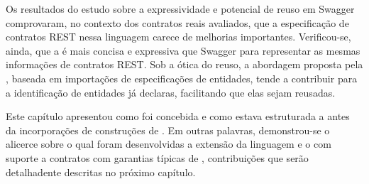 Os resultados do estudo sobre a expressividade e potencial de reuso em Swagger
comprovaram, no contexto dos contratos reais avaliados, que a especificação de
contratos REST nessa linguagem carece de melhorias importantes. Verificou-se,
ainda, que a \neoidl{} é mais concisa e expressiva que Swagger para representar
as mesmas informações de contratos REST. Sob a ótica do reuso, a abordagem proposta pela
\neoidl{}, baseada em importações de especificações de entidades, tende a
contribuir para a identificação de entidades já declaras, facilitando que
elas sejam reusadas.

Este capítulo apresentou como foi concebida e como estava estruturada a
\neoidl{} antes da incorporações de construções de \designbycontract{}. Em
outras palavras, demonstrou-se o alicerce sobre o qual foram
desenvolvidas a extensão da linguagem e o \framework{} \neoidl{} com suporte a
contratos com garantias típicas de \designbycontract{}, contribuições que serão
detalhadente descritas no próximo capítulo.
